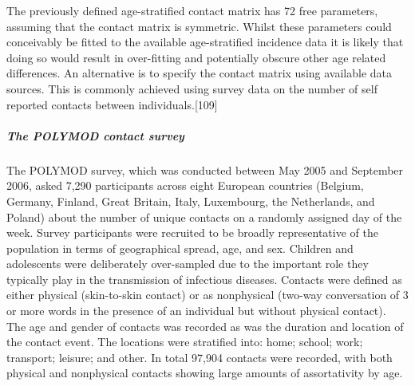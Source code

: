 \documentclass[11pt,twoside]{bristolthesis}
\begin{document}
  The previously defined age-stratified contact matrix has 72 free parameters, assuming that the contact matrix is symmetric. Whilst these parameters could conceivably be fitted to the available age-stratified incidence data it is likely that doing so would result in over-fitting and potentially obscure other age related differences. An alternative is to specify the contact matrix using available data sources. This is commonly achieved using survey data on the number of self reported contacts between individuals.{[}109{]}
  
  \hypertarget{the-polymod-contact-survey}{%
  \subparagraph{The POLYMOD contact survey}\label{the-polymod-contact-survey}}
  
  The POLYMOD survey, which was conducted between May 2005 and September 2006, asked 7,290 participants across eight European countries (Belgium, Germany, Finland, Great Britain, Italy, Luxembourg, the Netherlands, and Poland) about the number of unique contacts on a randomly assigned day of the week. Survey participants were recruited to be broadly representative of the population in terms of geographical spread, age, and sex. Children and adolescents were deliberately over-sampled due to the important role they typically play in the transmission of infectious diseases. Contacts were defined as either physical (skin-to-skin contact) or as nonphysical (two-way conversation of 3 or more words in the presence of an individual but without physical contact). The age and gender of contacts was recorded as was the duration and location of the contact event. The locations were stratified into: home; school; work; transport; leisure; and other. In total 97,904 contacts were recorded, with both physical and nonphysical contacts showing large amounts of assortativity by age.
  
\end{document}
